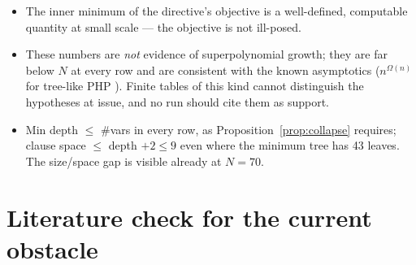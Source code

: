 \documentclass[11pt]{article}
\theoremstyle{definition}
\begin{document}
\begin{itemize}
\item The inner minimum of the directive's objective is a well-defined,
computable quantity at small scale --- the objective is not ill-posed.
\item These numbers are \emph{not} evidence of superpolynomial growth; they are
far below $N$ at every row and are consistent with the known asymptotics
($n^{\Omega(n)}$ for tree-like PHP \cite{dantchevriis01}). Finite tables of
this kind cannot distinguish the hypotheses at issue, and no run should cite
them as support.
\item Min depth $\le$ \#vars in every row, as Proposition~\ref{prop:collapse}
requires; clause space $\le$ depth $+2\le 9$ even where the minimum tree has
43 leaves. The size/space gap is visible already at $N=70$.
\end{itemize}

\section{Literature check for the current obstacle}
\end{document}
